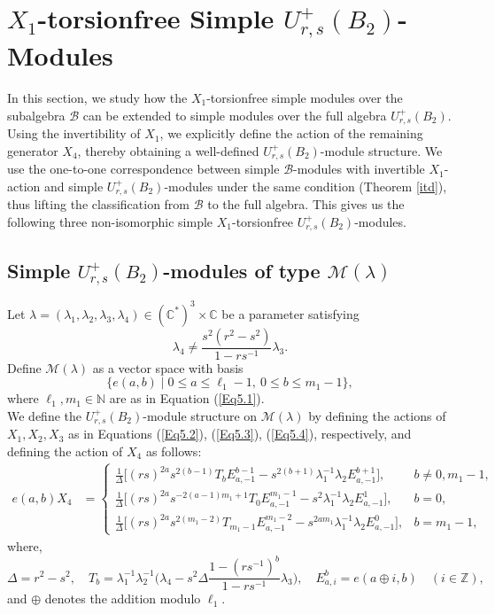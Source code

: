 \documentclass[12 pt,reqno]{amsart}
\numberwithin{equation}{section}
\newcommand{\Z}{\mathbb{Z}}
\theoremstyle{definition}
\theoremstyle{definition}
\theoremstyle{remark}
\theoremstyle{remark}
\begin{document}
\section{\texorpdfstring{$X_1$-torsionfree Simple $ U_{r,s}^+(B_2) $-Modules}{}}

In this section, we study how the $ X_1 $-torsionfree simple modules over the subalgebra $ \mathcal{B} $ can be extended to simple modules over the full algebra $ U^+_{r,s}(B_2) $. Using the invertibility of $X_1$, we explicitly define the action of the remaining generator $X_4$, thereby obtaining a well-defined $ U^+_{r,s}(B_2) $-module structure. We use the one-to-one correspondence between simple $ \mathcal{B}  $-modules with invertible $ X_1 $-action and simple $ U^+_{r,s}(B_2) $-modules under the same condition (Theorem \ref{itd}), thus lifting the classification from $ \mathcal{B} $ to the full algebra. This gives us the following three non-isomorphic simple $X_1$-torsionfree $U_{r,s}^+(B_2)$-modules.
\subsection{\texorpdfstring{Simple $ U_{r,s}^+(B_2) $-modules of type $ \mathcal{M}(\lambda) $}{}}

Let $ \lambda = (\lambda_1, \lambda_2, \lambda_3, \lambda_4) \in (\mathbb{C}^*)^3 \times \mathbb{C} $ be a parameter satisfying  
\[\lambda_4 \neq \frac{s^2 (r^2 - s^2)}{1 - rs^{-1}} \lambda_3.\]
Define $ \mathcal{M}(\lambda) $ as a vector space with basis  
$$
    \{ e(a, b) \mid 0 \leq a \leq \ell_1 - 1, \ 0 \leq b \leq m_1 - 1 \},
$$  
where $ \ell_1, m_1 \in \mathbb{N} $ are as in Equation (\ref{Eq5.1}). \\
We define the $ U_{r,s}^+(B_2) $-module structure on $ \mathcal{M}(\lambda) $ by defining the actions of $X_1, X_2, X_3$ as in Equations (\ref{Eq5.2}), (\ref{Eq5.3}), (\ref{Eq5.4}), respectively, and defining the action of $X_4$ as follows:
\begin{align*}
    e(a,b)X_4 &= 
    \begin{cases}
        \displaystyle \frac{1}{\Delta} \Bigg[ 
            (rs)^{2a} s^{2(b-1)} T_bE^{b-1}_{a,-1}- s^{2(b+1)} \lambda_1^{-1} \lambda_2   E^{b+1}_{a,-1}
        \Bigg],  
        &  b \neq 0, m_1 - 1, \\[15pt]
\displaystyle\frac{1}{\Delta} \Bigg[ 
            (rs)^{2a} s^{-2(a-1) m_1+1} T_0E^{m_1-1}_{a,-1} 
            - s^{2} \lambda_1^{-1} \lambda_2 E^{1}_{a,-1} 
        \Bigg],  
        &  b = 0, \\[15pt]
\displaystyle\frac{1}{\Delta} \Bigg[ 
            (rs)^{2a} s^{2(m_1 - 2)} T_{m_1-1}
            E^{m_1-2}_{a,-1} - s^{2 a m_1} \lambda_1^{-1} \lambda_2 E^{0}_{a,-1} 
        \Bigg],  
        & b = m_1 - 1,
    \end{cases}
\end{align*}
where, $$\Delta=r^2 - s^2,\quad T_b=\lambda_1^{-1} \lambda_2^{-1} 
            \bigg( \lambda_4 - s^2 \Delta  
            \frac{1 - (rs^{-1})^b}{1 - rs^{-1}} \lambda_3 \bigg), \quad E^{b}_{a,i}=e(a\oplus i,b)\quad (i\in\Z),$$ and $\oplus$ denotes the addition modulo $\ell_1$.
\end{document}
